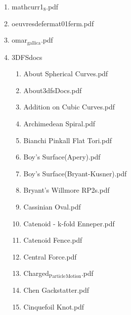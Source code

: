 \documentclass[11pt]{article}
\begin{document}
\begin{enumerate}
\item mathcurr1$_{\text{8}}$.pdf
\label{sec-1-1-1-1-29-17}

\item oeuvresdefermat01ferm.pdf
\label{sec-1-1-1-1-29-18}

\item omar$_{\text{gallica}}$.pdf
\label{sec-1-1-1-1-29-19}

\item 3DFSdocs
\label{sec-1-1-1-1-29-20}
\begin{enumerate}
\item About Spherical Curves.pdf
\label{sec-1-1-1-1-29-20-1}

\item About3dfsDocs.pdf
\label{sec-1-1-1-1-29-20-2}

\item Addition on Cubic Curves.pdf
\label{sec-1-1-1-1-29-20-3}

\item Archimedean Spiral.pdf
\label{sec-1-1-1-1-29-20-4}

\item Bianchi Pinkall Flat Tori.pdf
\label{sec-1-1-1-1-29-20-5}

\item Boy's Surface(Apery).pdf
\label{sec-1-1-1-1-29-20-6}

\item Boy's Surface(Bryant-Kusner).pdf
\label{sec-1-1-1-1-29-20-7}

\item Bryant's Willmore RP2s.pdf
\label{sec-1-1-1-1-29-20-8}

\item Cassinian Oval.pdf
\label{sec-1-1-1-1-29-20-9}

\item Catenoid - k-fold Enneper.pdf
\label{sec-1-1-1-1-29-20-10}

\item Catenoid Fence.pdf
\label{sec-1-1-1-1-29-20-11}

\item Central Force.pdf
\label{sec-1-1-1-1-29-20-12}

\item Charged$_{\text{Particle}}$$_{\text{Motion}}$.pdf
\label{sec-1-1-1-1-29-20-13}

\item Chen Gackstatter.pdf
\label{sec-1-1-1-1-29-20-14}

\item Cinquefoil Knot.pdf
\label{sec-1-1-1-1-29-20-15}


\end{enumerate}
\end{enumerate}
\end{document}
